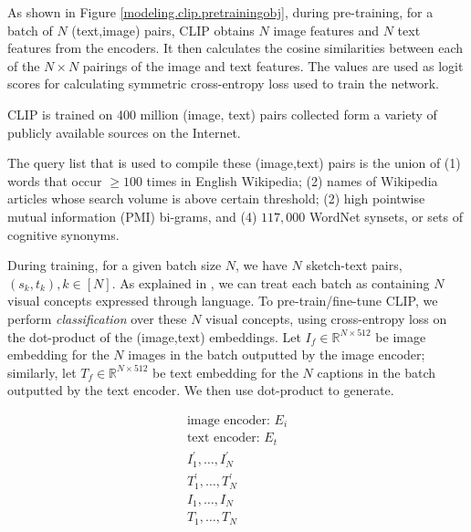 As shown in Figure \ref{modeling.clip.pretrainingobj}, during pre-training, for a batch of $N$ (text,image) pairs, CLIP obtains $N$ image features and $N$ text features from the encoders. It then calculates the cosine similarities between each of the $N \times N$ pairings of the image and text features. The values are used as logit scores for calculating symmetric cross-entropy loss used to train the network.      


CLIP is trained on 400 million (image, text) pairs collected form a variety of publicly available sources on the Internet.

The query list that is used to compile these (image,text) pairs is the union of (1) words that occur $\geq 100$ times in English Wikipedia; (2) names of Wikipedia articles whose search volume is above certain threshold; (2) high pointwise mutual information (PMI) bi-grams, and (4) $117,000$ WordNet synsets, or sets of cognitive synonyms. 

During training, for a given batch size $N$, we have $N$ sketch-text pairs, $(s_k,t_k), k\in [N]$. 
As explained in \cite{CLIPpaper}, we can treat each batch as containing $N$ visual concepts expressed through language.    
To pre-train/fine-tune CLIP, we perform \textit{classification} over these $N$ visual concepts, using cross-entropy loss on the dot-product of the (image,text) embeddings. 
Let $I_f \in \mathbb{R}^{N \times 512}$ be image embedding for the $N$ images in the batch outputted by the image encoder; similarly, 
let $T_f \in \mathbb{R}^{N \times 512}$ be text embedding for the $N$ captions in the batch outputted by the text encoder. 
We then use dot-product to generate.

\begin{equation}
\begin{split}
    \text{image encoder: } E_i \\
    \text{text encoder: } E_t \\
    I_1^{'},\dots, I_N^{'} \\
    T_1^{'},\dots, T_N^{'} \\
    I_1,\dots, I_N \\
    T_1,\dots, T_N \\
\end{split}
\end{equation}


